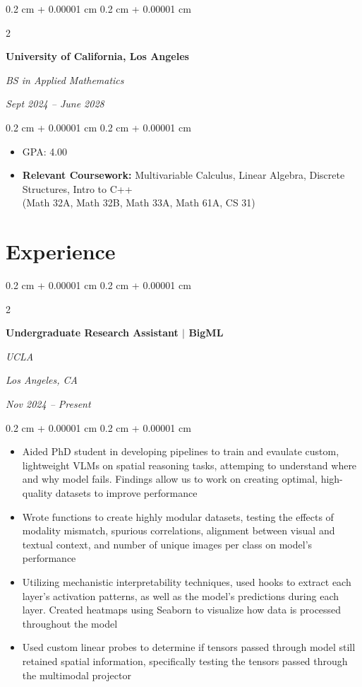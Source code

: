 \documentclass[10pt, letterpaper]{article}
\newenvironment{highlights}{
    \begin{itemize}[
        topsep=0.10 cm,
        parsep=0.10 cm,
        partopsep=0pt,
        itemsep=0pt,
        leftmargin=0.4 cm + 10pt
    ]
}{
    \end{itemize}
} %
\newenvironment{onecolentry}{
    \begin{adjustwidth}{
        0.2 cm + 0.00001 cm
    }{
        0.2 cm + 0.00001 cm
    }
}{
    \end{adjustwidth}
} %
\newenvironment{twocolentry}[2][]{
    \onecolentry
    \def\secondColumn{#2}
    \setcolumnwidth{\fill, 4.5 cm}
    \begin{paracol}{2}
}{
    \switchcolumn \raggedleft \secondColumn
    \end{paracol}
    \endonecolentry
} %
\let\hrefWithoutArrow\href
\renewcommand{\href}[2]{\hrefWithoutArrow{#1}{\ifthenelse{\equal{#2}{}}{ }{#2 }\raisebox{.15ex}{\footnotesize \faExternalLink*}}}
\begin{document}
        
        \begin{twocolentry}{
            
            
        \textit{Sept 2024 – June 2028}}
            \textbf{University of California, Los Angeles}

            \textit{BS in Applied Mathematics}
        \end{twocolentry}

        \vspace{0.10 cm}
        \begin{onecolentry}
            \begin{highlights}
                \item GPA: 4.00 %
                \item \textbf{Relevant Coursework:}  Multivariable Calculus, Linear Algebra, Discrete Structures, Intro to C++ \\ (Math 32A, Math 32B, Math 33A, Math 61A, CS 31)
            \end{highlights}
        \end{onecolentry}

    \section{Experience}
        \begin{twocolentry}{
        \textit{Los Angeles, CA}    
            
        \textit{Nov 2024 – Present}}
            \textbf{Undergraduate Research Assistant $|$ BigML}
            
            \textit{UCLA}
        \end{twocolentry}

        \vspace{0.10 cm}
        \begin{onecolentry}
            \begin{highlights}
                \item{Aided PhD student in developing pipelines to train and evaulate custom, lightweight VLMs on spatial reasoning tasks, attemping to understand where and why model fails. Findings allow us to work on creating optimal, high-quality datasets to improve performance}
                \item{Wrote functions to create highly modular datasets, testing the effects of modality mismatch, spurious correlations, alignment between visual and textual context, and number of unique images per class on model's performance}
                \item{Utilizing mechanistic interpretability techniques, used hooks to extract each layer's activation patterns, as well as the model's predictions during each layer. Created heatmaps using Seaborn to visualize how data is processed throughout the model}
                \item{Used custom linear probes to determine if tensors passed through model still retained spatial information, specifically testing the tensors passed through the multimodal projector}
            \end{highlights}
        \end{onecolentry}
    
\end{document}
